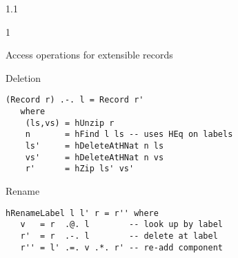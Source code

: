\documentclass{slides}
\newenvironment{myslide}{\begin{slide}\color{Blue}\begin{boxedminipage}{1.1\hsize}\begin{boxedminipage}{1\hsize}\color{Black}
\vspace{-170\in}
}{%
\smallskip
\end{boxedminipage}
\end{boxedminipage}
\end{slide}}
\newenvironment{myslide}{\begin{slide}
}{%
\end{slide}}
\newenvironment{myslide}{\begin{slide}\color{White}\begin{boxedminipage}{1.1\hsize}\color{Black}
\vspace{-170\in}
}{%
\smallskip
\end{boxedminipage}
\end{slide}}
\newcommand{\header}[1]{{\large \color{Red} #1}}
\newcommand{\blau}[1]{{\vspace{-50\in}\normalsize \color{Blue} #1}}
\begin{document}



\begin{myslide}

\header{Access operations for extensible records}

\vspace{-66\in}

\blau{Deletion}

\begin{Verbatim}[fontfamily=courier,fontsize=\small,commandchars=\\\{\}]
 (Record r) .-. l = Record r'
   where
    (ls,vs) = hUnzip r
    n       = hFind l ls -- uses HEq on labels
    ls'     = hDeleteAtHNat n ls
    vs'     = hDeleteAtHNat n vs
    r'      = hZip ls' vs'
\end{Verbatim}

\vspace{-66\in}

\blau{Rename}

\begin{Verbatim}[fontfamily=courier,fontsize=\small,commandchars=\\\{\}]
 hRenameLabel l l' r = r'' where
   v   = r  .@. l        -- look up by label
   r'  = r  .-. l        -- delete at label
   r'' = l' .=. v .*. r' -- re-add component
\end{Verbatim}

\end{myslide}



\end{document}
